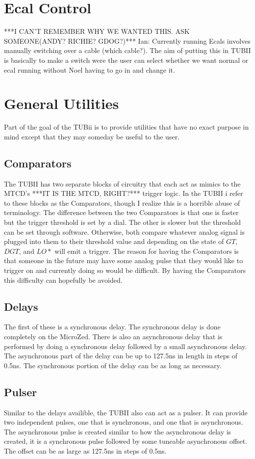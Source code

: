 \documentclass[11pt,a4paper]{article}
\begin{document}
\section{Ecal Control}
***I CAN'T REMEMBER WHY WE WANTED THIS. ASK SOMEONE(ANDY? RICHIE? GDOG?)***
Ian: Currently running Ecals involves manually switching over a cable (which cable?). The aim of putting this in TUBII is basically to make a switch were the user can select whether we want normal or ecal running without Noel having to go in and change it.

\section{General Utilities}

Part of the goal of the TUBii is to provide utilities that have no exact purpose in mind except that they may someday be useful to the user.
\subsection{Comparators}
The TUBII has two separate blocks of circuitry that each act as mimics to the MTCD's ***IT IS THE MTCD, RIGHT?*** trigger logic. In the TUBII i refer to these blocks as the Comparators, though I realize this is a horrible abuse of terminology. The difference between the two Comparators is that one is faster but the trigger threshold is set by a dial. The other is slower but the threshold can be set through software. Otherwise, both compare whatever analog signal is plugged into them to their threshold value and depending on the state of $GT$, $DGT$, and $LO*$ will emit a trigger. The reason for having the Comparators is that someone in the future may have some analog pulse that they would like to trigger on and currently doing so would be difficult. By having the Comparators this difficulty can hopefully be avoided.
\subsection{Delays}
The first of these is a synchronous delay. The synchronous delay is done completely on the MicroZed.  There is also an asynchronous delay that is performed by doing a synchronous delay followed by a small asynchronous delay. The asynchronous part of the delay can be up to 127.5ns in length in steps of 0.5ns. The synchronous portion of the delay can be as long as necessary.
\subsection{Pulser}
Similar to the delays availible, the TUBII also can act as a pulser. It can provide two independent pulses, one that is synchronous, and one that is asynchronous. The asynchronous pulse is created similar to how the asynchronous delay is created, it is a synchronous pulse followed by some tuneable asynchronous offset. The offset can be as large as 127.5ns in steps of 0.5ns.
\end{document}

